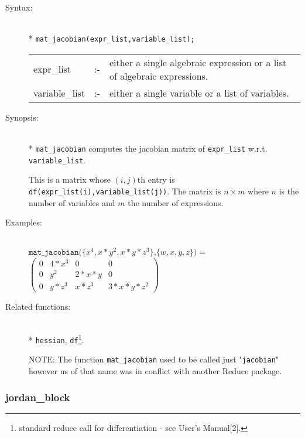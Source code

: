 \begin{description}
\item[Syntax:]\mbox{}\\*
\texttt{mat\_jacobian(expr\_list,variable\_list);}\\[2mm]
\begin{tabular}{l l p{.72\linewidth}}
expr\_list  &:-& either a
single algebraic expression or a list of algebraic expressions.\\
variable\_list &:-& either a single variable or a list of variables.
\end{tabular}

\item[Synopsis:]\mbox{}\\*
\texttt{mat\_jacobian} computes the jacobian matrix of \texttt{expr\_list} w.r.t.
\texttt{variable\_list}.

This is a matrix whose $(i,j)$th entry
is \texttt{df(expr\_list(i),variable\_list(j))}.  The matrix is $n\times m$
where $n$ is the number of variables and $m$ the number of expressions.

\item[Examples:]\mbox{}\\
  \(\texttt{mat\_jacobian(\{$x^4,x*y^2,x*y*z^3$\},\{$w,x,y,z$\})} =\) \\[2mm]
  \(\begin{pmatrix} 0 & 4*x^3 & 0 & 0 \\ 0 & y^2 & 2*x*y & 0 \\
  0 & y*z^3 & x*z^3 & 3*x*y*z^2
  \end{pmatrix}\)

\item[Related functions:]\mbox{}\\*
\texttt{hessian}, \texttt{df}\footnote{standard reduce call
for differentiation - see {\REDUCE} User's Manual[2].}.

NOTE: The function \texttt{mat\_jacobian} used to be called just "\texttt{jacobian}"
however us of that name was in conflict with another Reduce package.
\end{description}


\subsubsection{jordan\_block}
\label{linalg:jordan_block}

